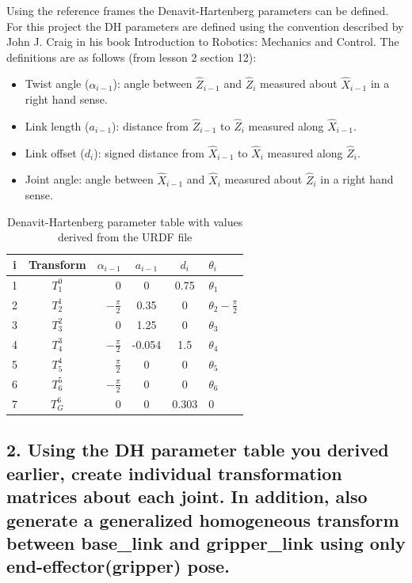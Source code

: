 \documentclass{article}
\begin{document}
Using the reference frames the Denavit-Hartenberg parameters can be defined. For this project the DH parameters are defined using the convention described by John J. Craig in his book Introduction to Robotics: Mechanics and Control. The definitions are as follows (from lesson 2 section 12):

\begin{itemize}
    \item Twist angle ($\alpha _{i-1}$): angle between $\hat{Z}_{i-1}$ and $\hat{Z}_i$ measured about $\hat{X}_{i-1}$ in a right hand sense.
    \item Link length ($a_{i-1}$): distance from $\hat{Z}_{i-1}$ to $\hat{Z}_i$ measured along $\hat{X}_{i-1}$.
    \item Link offset ($d_i$): signed distance from $\hat{X}_{i-1}$ to $\hat{X}_i$ measured along $\hat{Z}_i$.
    \item Joint angle: angle between $\hat{X}_{i-1}$ and $\hat{X}_i$ measured about $\hat{Z}_i$ in a right hand sense.
\end{itemize}

\begin{table}[H]
\centering
\begin{tabular}{|c|c|r|c|c|l|}
    \hline
    i & Transform & $\alpha _{i-1}$ & $a_{i-1}$ & $d_i$ & $\theta _i$ \\ \hline
    1 & $T_1^0$ & 0 & 0 & 0.75 & $\theta _1$ \\ \hline
    2 & $T_2^1$ & $-\frac{\pi}{2}$ & 0.35 & 0 & $\theta _2 - \frac{\pi}{2}$ \\ \hline
    3 & $T_3^2$ & 0 & 1.25 & 0 & $\theta _3$ \\ \hline
    4 & $T_4^3$ & $-\frac{\pi}{2}$ & -0.054 & 1.5 & $\theta _4$ \\ \hline
    5 & $T_5^4$ & $\frac{\pi}{2}$ & 0 & 0 & $\theta _5$ \\ \hline
    6 & $T_6^5$ & $-\frac{\pi}{2}$ & 0 & 0 & $\theta _6$ \\ \hline
    7 & $T_G^6$ & 0 & 0 & 0.303 & 0 \\ \hline

\end{tabular}
\caption{\label{tab:table-name}Denavit-Hartenberg parameter table with values derived from the URDF file}
\end{table}

\subsection{2. Using the DH parameter table you derived earlier, create individual transformation matrices about each joint. In addition, also generate a generalized homogeneous transform between base\_link and gripper\_link using only end-effector(gripper) pose.}
\end{document}
